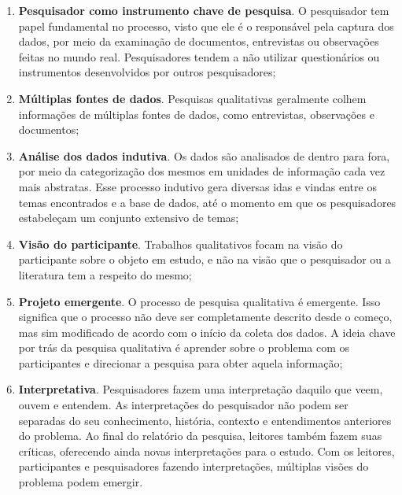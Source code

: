 \begin{enumerate}
  
  \item \textbf{Pesquisador como instrumento chave de pesquisa}. O pesquisador
  tem papel fundamental no processo, visto que ele é o responsável pela captura dos
  dados, por meio da examinação de documentos, entrevistas ou observações feitas
  no mundo real. Pesquisadores tendem a não utilizar questionários ou
  instrumentos desenvolvidos por outros pesquisadores;
  
  \item \textbf{Múltiplas fontes de dados}. Pesquisas qualitativas geralmente
  colhem informações de múltiplas fontes de dados, como entrevistas,
  observações e documentos;
  
  \item \textbf{Análise dos dados indutiva}. Os dados são analisados de dentro
  para fora, por meio da categorização dos mesmos em unidades de informação cada
  vez mais abstratas. Esse processo indutivo gera diversas idas e vindas entre
  os temas encontrados e a base de dados, até o momento em que os pesquisadores
  estabeleçam um conjunto extensivo de temas;
  
  \item \textbf{Visão do participante}. Trabalhos qualitativos focam na visão do
  participante sobre o objeto em estudo, e não na visão que o pesquisador ou a
  literatura tem a respeito do mesmo;
  
  \item \textbf{Projeto emergente}. O processo de pesquisa qualitativa é
  emergente. Isso significa que o processo não deve ser completamente descrito
  desde o começo, mas sim modificado de acordo com o início da coleta dos dados. 
  A ideia chave por trás da pesquisa qualitativa é
  aprender sobre o problema com os participantes e direcionar a pesquisa para
  obter aquela informação;
  
  \item \textbf{Interpretativa}. Pesquisadores fazem uma interpretação daquilo
  que veem, ouvem e entendem. As interpretações do pesquisador não podem ser
  separadas do seu conhecimento, história, contexto e entendimentos anteriores
  do problema. Ao final do relatório da pesquisa, leitores também fazem suas
  críticas, oferecendo ainda novas interpretações para o estudo. Com os
  leitores, participantes e pesquisadores fazendo interpretações, múltiplas
  visões do problema podem emergir.
  
\end{enumerate} 

